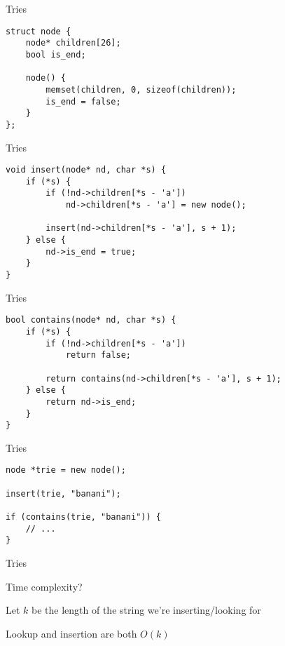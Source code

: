 \begin{frame}[fragile]{Tries}
    \begin{verbatim}
struct node {
    node* children[26];
    bool is_end;

    node() {
        memset(children, 0, sizeof(children));
        is_end = false;
    }
};
    \end{verbatim}
\end{frame}

\begin{frame}[fragile]{Tries}
    \begin{verbatim}
void insert(node* nd, char *s) {
    if (*s) {
        if (!nd->children[*s - 'a'])
            nd->children[*s - 'a'] = new node();

        insert(nd->children[*s - 'a'], s + 1);
    } else {
        nd->is_end = true;
    }
}
    \end{verbatim}
\end{frame}

\begin{frame}[fragile]{Tries}
    \begin{verbatim}
bool contains(node* nd, char *s) {
    if (*s) {
        if (!nd->children[*s - 'a'])
            return false;

        return contains(nd->children[*s - 'a'], s + 1);
    } else {
        return nd->is_end;
    }
}
    \end{verbatim}
\end{frame}

\begin{frame}[fragile]{Tries}
    \begin{verbatim}
node *trie = new node();

insert(trie, "banani");

if (contains(trie, "banani")) {
    // ...
}
    \end{verbatim}
\end{frame}

\begin{frame}{Tries}
    \bi
        \item Time complexity?
        \vspace{10pt}
        \item Let $k$ be the length of the string we're inserting/looking for
        \item Lookup and insertion are both $O(k)$
    \ei
\end{frame}

